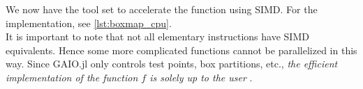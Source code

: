 We now have the tool set to accelerate the function  using SIMD. For 
the implementation, see \autoref{lst:boxmap_cpu}. \\

It is important to note that not all elementary instructions have SIMD equivalents. Hence 
some more complicated functions cannot be parallelized in this way. Since GAIO.jl only 
controls test points, box partitions, etc., \emph{
the efficient implementation of the function $f$ is solely up to the user
}.

